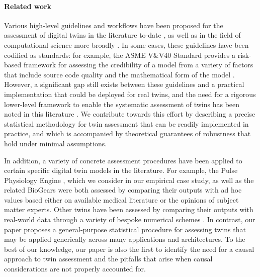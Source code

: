 \paragraph{Related work}

%
Various high-level guidelines and workflows have been proposed for the assessment of digital twins in the literature to-date \cite{grieves2017digital,khan2018digital,corral2020digital,kochunas2021digital,niederer2021scaling,dahmen2022verification}, as well as in the field of computational science more broadly \cite{roy2011comprehensive,niederer2021scaling}. %
In some cases, these guidelines have been codified as standards: for example, the ASME V\&V40 Standard \cite{amse2018assessing} provides a risk-based framework for assessing the credibility of a model from a variety of factors that include source code quality and the mathematical form of the model \cite{galappaththige2022credibility}.
%
However, a significant gap still exists between these guidelines and a practical implementation that could be deployed for real twins, and the need for a rigorous lower-level framework to enable the systematic assessment of twins has been noted in this literature \cite{corral2020digital,niederer2021scaling,kapteyn2021probabilistic,masison2021modular}.
We contribute towards this effort by describing a precise statistical methodology for twin assessment that can be readily implemented in practice, and which is accompanied by theoretical guarantees of robustness that hold under minimal assumptions.
%

In addition, a variety of concrete assessment procedures have been applied to certain specific digital twin models in the literature.
For example, the Pulse Physiology Engine \cite{pulse}, which we consider in our empirical case study, as well as the related BioGears \cite{sepsis-modelling,biogears} were both assessed by comparing their outputs with ad hoc values based either on available medical literature or the opinions of subject matter experts.
Other twins have been assessed by comparing their outputs with real-world data through a variety of bespoke numerical schemes \cite{larrabide2012fast,hemmler2019patient,DT-patient,jans2020digital,galappaththige2022credibility}.
In contrast, our paper proposes a general-purpose statistical procedure for assessing twins that may be applied generically across many applications and architectures. %
To the best of our knowledge, our paper is also the first to identify the need for a causal approach to twin assessment and the pitfalls that arise when causal considerations are not properly accounted for.


